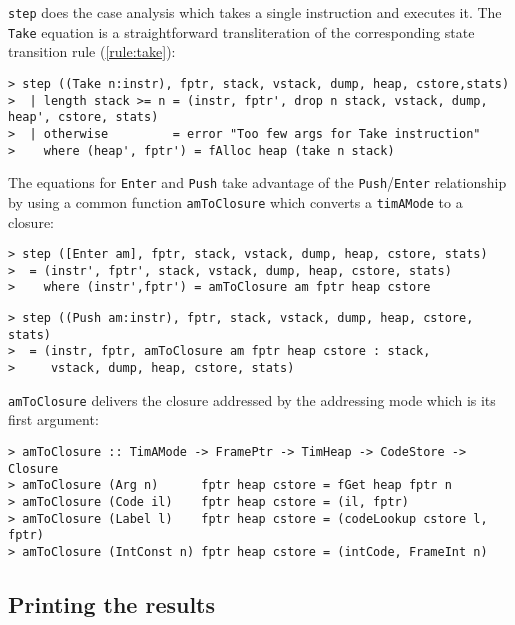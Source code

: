 \mbox{\tt step} does the case analysis which takes a single instruction and
executes it. The \mbox{\tt Take} equation is a
straightforward transliteration of the corresponding state transition rule
(\ref{rule:take}):
\begin{verbatim}
> step ((Take n:instr), fptr, stack, vstack, dump, heap, cstore,stats)
>  | length stack >= n = (instr, fptr', drop n stack, vstack, dump, heap', cstore, stats)
>  | otherwise         = error "Too few args for Take instruction"
>    where (heap', fptr') = fAlloc heap (take n stack)
\end{verbatim}
%
The equations for \mbox{\tt Enter} and \mbox{\tt Push} take advantage of the \mbox{\tt Push}/\mbox{\tt Enter}
relationship
by using a common function \mbox{\tt amToClosure} which converts
a \mbox{\tt timAMode} to a closure:
\begin{verbatim}
> step ([Enter am], fptr, stack, vstack, dump, heap, cstore, stats)
>  = (instr', fptr', stack, vstack, dump, heap, cstore, stats)
>    where (instr',fptr') = amToClosure am fptr heap cstore
\end{verbatim}
%
\begin{verbatim}
> step ((Push am:instr), fptr, stack, vstack, dump, heap, cstore, stats)
>  = (instr, fptr, amToClosure am fptr heap cstore : stack,
>     vstack, dump, heap, cstore, stats)
\end{verbatim}
%
\mbox{\tt amToClosure} delivers the closure addressed by the addressing mode
which is its first argument:
\begin{verbatim}
> amToClosure :: TimAMode -> FramePtr -> TimHeap -> CodeStore -> Closure
> amToClosure (Arg n)      fptr heap cstore = fGet heap fptr n
> amToClosure (Code il)    fptr heap cstore = (il, fptr)
> amToClosure (Label l)    fptr heap cstore = (codeLookup cstore l, fptr)
> amToClosure (IntConst n) fptr heap cstore = (intCode, FrameInt n)
\end{verbatim}
%
%
%
%
%
\subsection{Printing the results}

